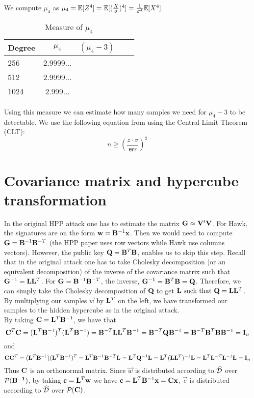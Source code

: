 We compute $\mu_4$ as $\mu_4 = \mathbb{E}[Z^4] = \mathbb{E}[(\frac{X}{\sigma})^4] = \frac{1}{\sigma^4}\mathbb{E}[X^4]$.

\begin{table}[H]
    \centering
    \caption{Measure of $\mu_4$}
    \begin{tabular}{lcccc}
        \toprule
        \textbf{Degree} & $\mu_4$ & $(\mu_4 - 3)$\\
        \midrule
        256 & 2.9999... & \\
        512 & 2.9999... \\
        1024 & 2.999... \\
        \bottomrule
    \end{tabular}
\end{table}

Using this measure we can estimate how many samples we need for $\mu_4 - 3$ to be detectable.
We use the following equation from using the Central Limit Theorem (CLT): 
\[
    n \geq (\frac{z\cdot \sigma}{\mathsf{err}})^2
\]

\section{Covariance matrix and hypercube transformation}
In the original HPP attack one has to estimate the matrix $\mathbf{G} \approx \mathbf{V} ^t \mathbf{V}$.
For Hawk, the signatures are on the form $\mathbf{w} = \mathbf{B}^{-1} \mathbf{x}$. Then we would need to compute $\mathbf{G} = \mathbf{B}^{-1} \mathbf{B}^{-T}$ (the HPP paper uses row vectors while Hawk use columns vectors).
However, the public key $\mathbf{Q} = \mathbf{B}^T \mathbf{B}$, enables us to skip this step.
Recall that in the original attack one has to take Cholesky decomposition (or an equivalent decomposition) of the inverse of the covariance matrix such that $\mathbf{G}^{-1} = \mathbf{L}\mathbf{L}^T$. 
For $\mathbf{G} = \mathbf{B}^{-1} \mathbf{B}^{-T}$, the inverse,
$\mathbf{G}^{-1} = \mathbf{B}^T \mathbf{B} = \mathbf{Q}$. Therefore, we can simply take the Cholesky decomposition of $\mathbf{Q}$ to get $\mathbf{L} \text{ such that } \mathbf{Q} = \mathbf{L} \mathbf{L}^T$.
By multiplying our samples $\vec{w}$ by $\mathbf{L}^T$ on the left, we have transformed our samples to the hidden hypercube as in the original attack. \\
By taking $\mathbf{C} =  \mathbf{L}^T\mathbf{B}^{-1}$, we have that 
\[\mathbf{C}^T \mathbf{C} = (\mathbf{L}^T \mathbf{B}^{-1})^T (\mathbf{L}^T \mathbf{B}^{-1}) = \mathbf{B}^{-T} \mathbf{L} \mathbf{L}^T \mathbf{B}^{-1} = \mathbf{B}^{-T} \mathbf{Q} \mathbf{B}^{-1} = \mathbf{B}^{-T} \mathbf{B}^{T} \mathbf{B} \mathbf{B}^{-1} = \mathbf{I}_n\]
and
\[\mathbf{C}\mathbf{C}^T = (\mathbf{L}^T \mathbf{B}^{-1})(\mathbf{L}^T \mathbf{B}^{-1})^T = \mathbf{L}^T \mathbf{B}^{-1} \mathbf{B}^{-T} \mathbf{L} =  \mathbf{L}^T \mathbf{Q}^{-1} \mathbf{L} = \mathbf{L}^T (\mathbf{L} \mathbf{L}^T)^{-1} \mathbf{L} = \mathbf{L}^T \mathbf{L}^{-T} \mathbf{L}^{-1} \mathbf{L} = \mathbf{I}_n\]
Thus $\mathbf{C}$ is an orthonormal matrix.
Since $\vec{w}$ is distributed according to $\widehat{\mathcal{D}}$ over $\mathcal{P}_{}(\mathbf{\mathbf{B}^{-1}})$, by taking 
$\mathbf{c} = \mathbf{L}^{T} \mathbf{w}$ we have $\mathbf{c} = \mathbf{L}^{T} \mathbf{B}^{-1} \mathbf{x} = \mathbf{C} \mathbf{x}$, $\vec{c}$ is distributed according to $\widehat{\mathcal{D}}$ over $\mathcal{P}_{}(\mathbf{C})$.

